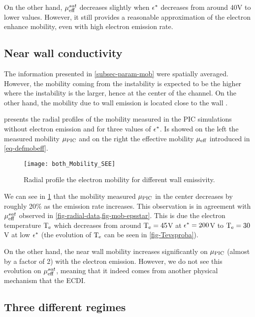   On the other hand, $\mu_{\mathrm{eff}}^{sat}$ decreases slightly when $\epsilon^{*}$ decreases from around 40V to lower values.
  However, it still provides a reasonable approximation of the electron enhance mobility, even with high electron emission rate. 
  
  \subsection{Near wall conductivity}
  
  The information presented in \cref{subsec-param-mob} were spatially averaged.
  However, the mobility coming from the  instability is expected to be the higher where the instability is the larger, hence at the center of the channel.
  On the other hand, the mobility due to wall emission is located close to the wall \citep{morozov1972}.
  
   presents the radial profiles of the mobility measured in the \ac{PIC}  simulations without electron emission and for three values of $\epsilon^{*}$.
  Is showed on the left the measured mobility $\mu_{\mathrm{PIC}}$ and on the right the effective mobility $\mu_{\mathrm{eff}}$ introduced in \cref{eq-defmobeff}.
  
  \begin{figure}[hbtp]
    \centering
    \texttt{[image: both\_Mobility\_SEE]}
    \caption{Radial profile the electron mobility for different wall emissivity. }
    \label{fig-radial-data}
  \end{figure}
  
  We can see in \cref{fig-radial-data} that the mobility measured $\mu_{\mathrm{PIC}}$  in the center decreases by roughly 20\% as the emission rate increases.
  This observation is in agreement with $\mu_{\mathrm{eff}}^{sat}$ observed in \cref{fig-radial-data,fig-mob-epsstar}.
  This is due the electron temperature $\mathrm{T_e}$ which decreases from around $\mathrm{T_e}=45$V at $\epsilon^{*}=200$V to $\mathrm{T_e}=30$V at low $\epsilon^{*}$ (the evolution of $\mathrm{T_e}$ can be seen in \cref{fig-Tevsproba}).
  
  On the other hand, the near wall mobility increases significantly on $\mu_{\mathrm{PIC}}$ (almost by a factor of 2) with the electron emission.
  However, we do not see this evolution on $\mu_{\mathrm{eff}}^{sat}$, meaning that it indeed comes from another physical mechanism that the \ac{ECDI}.
  
  
  \subsection{Three different regimes}

